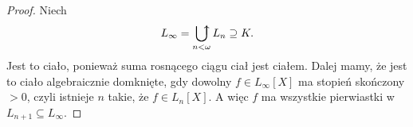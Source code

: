 \begin{proof}
Niech
$$L_\infty=\abigcup\limits_{n<\omega}L_n\supseteq K.$$
Jest to ciało, ponieważ suma rosnącego ciągu ciał jest ciałem. Dalej mamy, że jest to ciało algebraicznie domknięte, gdy dowolny $f\in L_\infty [X]$ ma stopień skończony $>0$, czyli istnieje $n$ takie, że $f\in L_n[X]$. A więc $f$ ma wszystkie pierwiastki w $L_{n+1}\subseteq L_\infty$.
\end{proof}

